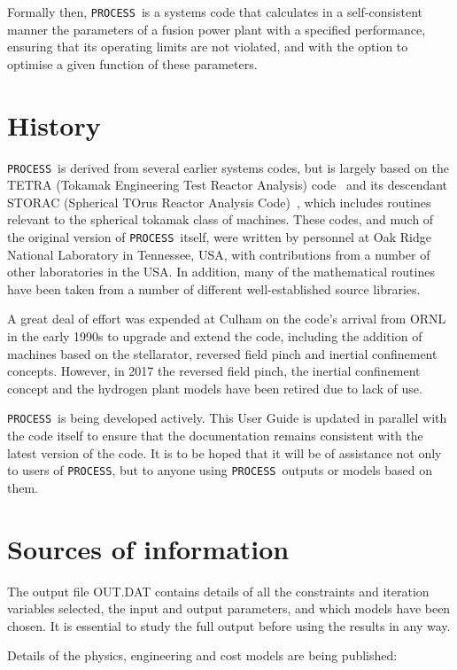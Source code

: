 \documentclass[11pt,a4paper]{report}
\newcommand{\process}{\mbox{\texttt{PROCESS}}}
\begin{document}
Formally then, \process\ is a systems code that calculates in a
self-consistent manner the parameters of a fusion power plant with a specified
performance, ensuring that its operating limits are not violated, and with the
option to optimise a given function of these parameters.

\section{History}

\process\ is derived from several earlier systems codes, but is largely based
on the TETRA (Tokamak Engineering Test Reactor Analysis) code~\cite{tetra} and
its descendant STORAC (Spherical TOrus Reactor Analysis Code)~\cite{storac},
which includes routines relevant to the spherical tokamak class of
machines. These codes, and much of the original version of \process\ itself,
were written by personnel at Oak Ridge National Laboratory in Tennessee, USA,
with contributions from a number of other laboratories in the USA\@. In
addition, many of the mathematical routines have been taken from a number of
different well-established source libraries.

A great deal of effort was expended at Culham on the code's arrival from ORNL in the early
1990s to upgrade and extend the code, including the addition of machines based on the stellarator, reversed field pinch and inertial confinement concepts. However, in 2017 the reversed field pinch, the inertial confinement concept and the hydrogen plant models have been retired due to lack of use.

\process\ is being developed actively. This User Guide is updated in parallel with the 
code itself to ensure that the documentation remains consistent with
the latest version of the code. It is to be hoped that it will be of
assistance not only to users of \process, but to anyone using  \process\ outputs or models based on them.


\section{Sources of information}

The output file OUT.DAT contains details of all the constraints and iteration variables selected, the input and output parameters, and which models have been chosen. It is essential to study the full output before using the results in any way.

Details of the physics, engineering and cost models are being published:
\end{document}
